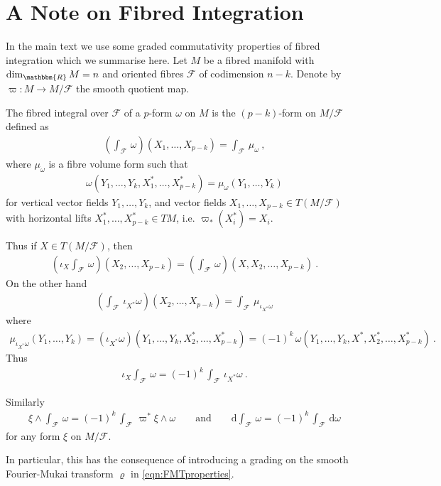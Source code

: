 \documentclass[a4paper, reqno, 11pt]{amsart}
\numberwithin{equation}{section}
\theoremstyle{definition}
\newcommand{\de}{\mathrm{d}}
\newcommand{\IR}{\mathbbm{R}}
\newcommand{\cF}{{\mathcal F}}
\theoremstyle{remark}
\begin{document}
\medskip

\appendix

\section{A Note on Fibred Integration}\label{appendix}

In the main text we use some graded commutativity properties of fibred integration which we summarise here. Let $M$ be a fibred manifold with $\dim_\IR M = n$ and oriented fibres $\cF$ of codimension $n-k$. Denote by $\varpi:M\to M/\cF$ the smooth quotient map.

The fibred integral over $\cF$ of a $p$-form $\omega$ on $M$ is the $(p{-}k)$-form on $M/\cF$ defined as
\begin{align}
    \left (\int_{\cF}\, \omega\right )(X_1,\dots,X_{p-k}) = \int_{\cF}\, \mu_\omega \ ,
\end{align}
where $\mu_\omega$ is a fibre volume form such that
\begin{align}
    \omega(Y_1,\dots,Y_k, X^*_1,\dots, X^*_{p-k}) = \mu_\omega(Y_1,\dots,Y_k)
\end{align}
for vertical vector fields $Y_1,\dots,Y_k$, and vector fields $X_1,\dots,X_{p-k}\in T(M/\cF)$ with horizontal lifts $X_1^*,\dots,X_{p-k}^*\in TM$, i.e. $\varpi_*(X_i^*)=X_i$. 

Thus if $X\in T(M/\cF)$, then
\begin{align}
   \left ( \iota_X \int_{\cF}\,\omega \right)(X_2,\dots,X_{p-k}) = \left (\int_{\cF}\, \omega \right)(X,X_2,\dots,X_{p-k}) \ .
\end{align}
On the other hand
\begin{align}
    \left (\int_{\cF}\, \iota_{ X^*} \omega \right ) (X_2,\dots,X_{p-k}) = \int_{\cF}\, \mu_{\iota_{X^*}\omega}
\end{align}
where 
\begin{align}
    \mu_{\iota_{X^*}\omega}(Y_1,\dots,Y_k) = (\iota_{ X^*}\omega)(Y_1,\dots,Y_k,  X^*_2,\dots, X^*_{p-k}) = (-1)^k\, \omega(Y_1,\dots,Y_k,  X^*,  X^*_2,\dots,  X^*_{p-k}) \ .
\end{align}
Thus
\begin{align}
    \iota_X \int_\cF\, \omega = (-1)^k\, \int_\cF\, \iota_{ X^*} \omega \ .
\end{align}

Similarly
\begin{align}
    \xi \wedge \int_\cF\, \omega = (-1)^k\, \int_\cF\, \varpi^* \xi \wedge \omega \qquad \text{and} \qquad \de \int_\cF\, \omega = (-1)^k\, \int_\cF\, \de \omega
\end{align}
for any form $\xi$ on $M/\cF$. 

In particular, this has the consequence of introducing a grading on the smooth Fourier-Mukai transform $\varrho$ in \eqref{eqn:FMTproperties}.



\end{document}
